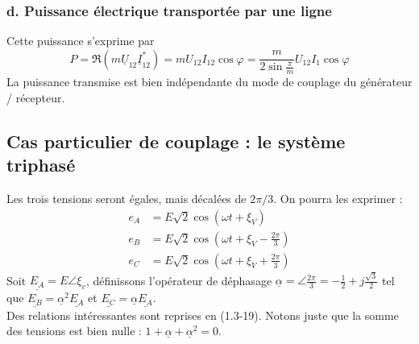 \subsubsection{d. Puissance électrique transportée par une ligne}
Cette puissance s'exprime par 
\begin{equation}
	P = \Re(m\underline{U}_{12}\underline{I}_{12}^*) = mU_{12}I_{12}\cos
	\varphi = \frac{m}{2\sin\frac{\pi}{m}}U_{12}I_1\cos\varphi
\end{equation}
La puissance transmise est bien indépendante du mode de couplage du 
générateur / récepteur.
		
\subsection{Cas particulier de couplage : le système triphasé}
Les trois tensions seront égales, mais décalées de $2\pi/3$. On pourra 
les exprimer :
\begin{equation}
	\begin{array}{ll}
		e_A & = E\sqrt{2}\cos(\omega t +\xi_V)                  \\
		e_B & = E\sqrt{2}\cos(\omega t +\xi_V - \frac{2\pi}{3}) \\
		e_C & = E\sqrt{2}\cos(\omega t +\xi_V + \frac{2\pi}{3}) 
	\end{array}
\end{equation}
Soit $\underline{E_A}=E \angle \xi_v$, définissons l'opérateur de déphasage $\underline{\alpha} = \angle \frac{2
	\pi}{3} = -\frac{1}{2}+j\frac{\sqrt{3}}{2}$ tel que $\underline{E_B} = 
\underline{\alpha}^2\underline{E_A}$ et $\underline{E_C} = \underline{\alpha}
\underline{E_A}$.\\
Des relations intéressantes sont reprises en (1.3-19). Notons juste que 
la somme des tensions est bien nulle : $1+\underline{\alpha}+\underline{
	\alpha}^2 = 0$.
		
